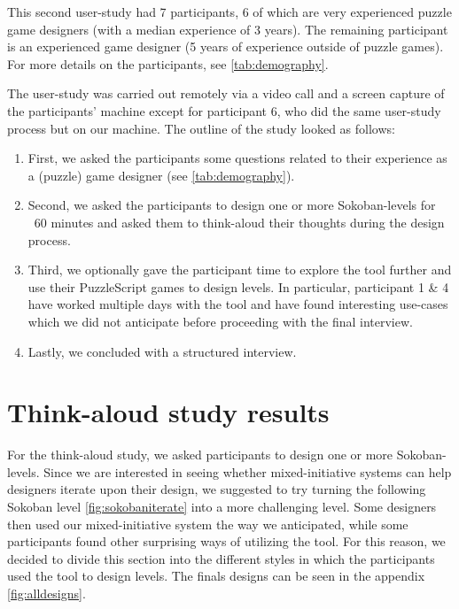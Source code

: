 This second user-study had 7 participants, 6 of which are very experienced puzzle game designers (with a median experience of 3 years). The remaining participant is an experienced game designer (5 years of experience outside of puzzle games). For more details on the participants, see \ref{tab:demography}.

The user-study was carried out remotely via a video call and a screen capture of the participants' machine except for participant 6, who did the same user-study process but on our machine. The outline of the study looked as follows:

\begin{enumerate}
\item  First, we asked the participants some questions related to their experience as a (puzzle) game designer (see \ref{tab:demography}).
\item Second, we asked the participants to design one or more Sokoban-levels for ~60 minutes and asked them to think-aloud their thoughts during the design process.
\item Third, we optionally gave the participant time to explore the tool further and use their PuzzleScript games to design levels. In particular, participant 1 \& 4 have worked multiple days with the tool and have found interesting use-cases which we did not anticipate before proceeding with the final interview.
\item Lastly, we concluded with a structured interview.
\end{enumerate}


\section{Think-aloud study results}
For the think-aloud study, we asked participants to design one or more Sokoban-levels. 
Since we are interested in seeing whether mixed-initiative systems can help designers iterate upon their design, we suggested to try turning the following Sokoban level \ref{fig:sokobaniterate} into a more challenging level. Some designers then used our mixed-initiative system the way we anticipated, while some participants found other surprising ways of utilizing the tool. For this reason, we decided to divide this section into the different styles in which the participants used the tool to design levels. The finals designs can be seen in the appendix \autoref{fig:alldesigns}.


